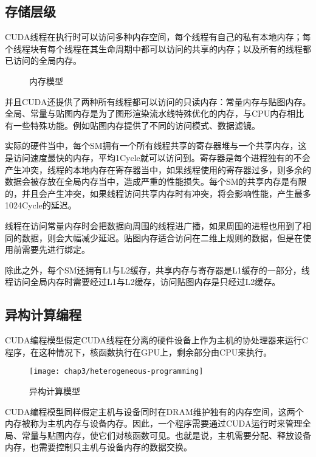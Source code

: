     \subsection{存储层级}
      CUDA线程在执行时可以访问多种内存空间，每个线程有自己的私有本地内存；每个线程块有每个线程在其生命周期中都可以访问的共享的内存；以及所有的线程都已访问的全局内存。
      \par
      \begin{figure}[htp]
        \centering
        \hspace{1cm}
        \caption{内存模型}
      \end{figure}
      并且CUDA还提供了两种所有线程都可以访问的只读内存：常量内存与贴图内存。全局、常量与贴图内存是为了图形渲染流水线特殊优化的内存，与CPU内存相比有一些特殊功能。例如贴图内存提供了不同的访问模式、数据滤镜。
      \par
      实际的硬件当中，每个SM拥有一个所有线程共享的寄存器堆与一个共享内存，这是访问速度最快的内存，平均1Cycle就可以访问到。寄存器是每个进程独有的不会产生冲突，线程的本地内存在寄存器当中，如果线程使用的寄存器过多，则多余的数据会被存放在全局内存当中，造成严重的性能损失。每个SM的共享内存是有限的，并且会产生冲突，如果线程访问共享内存时有冲突，将会影响性能，产生最多1024Cycle的延迟。
      \par
      线程在访问常量内存时会把数据向周围的线程进广播，如果周围的进程也用到了相同的数据，则会大幅减少延迟。贴图内存适合访问在二维上规则的数据，但是在使用前需要先进行绑定。
      \par
      除此之外，每个SM还拥有L1与L2缓存，共享内存与寄存器是L1缓存的一部分，线程访问全局内存时需要经过L1与L2缓存，访问贴图内存是只经过L2缓存。
    \subsection{异构计算编程}
      CUDA编程模型假定CUDA线程在分离的硬件设备上作为主机的协处理器来运行C程序，在这种情况下，核函数执行在GPU上，剩余部分由CPU来执行。
      \begin{figure}[htp]
        \centering
        \texttt{[image: chap3/heterogeneous-programming]}
        \caption{异构计算模型}
      \end{figure}
      \par
      CUDA编程模型同样假定主机与设备同时在DRAM维护独有的内存空间，这两个内存被称为主机内存与设备内存。因此，一个程序需要通过CUDA运行时来管理全局、常量与贴图内存，使它们对核函数可见。也就是说，主机需要分配、释放设备内存，也需要控制只主机与设备内存的数据交换。
